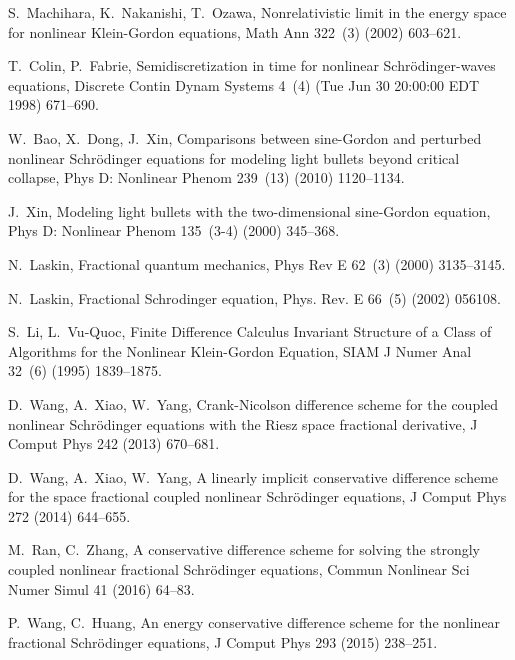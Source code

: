 \documentclass[preprint,compress,3p,10pt,fleqn]{elsarticle}
\numberwithin{equation}{section}
\begin{document}
\begin{thebibliography}{10}
	S.~Machihara, K.~Nakanishi, T.~Ozawa, Nonrelativistic limit in the energy space for nonlinear Klein-Gordon equations, Math Ann
	  322~(3) (2002) 603--621.
	
	T.~Colin, P.~Fabrie, Semidiscretization in time for nonlinear Schr\"odinger-waves equations, Discrete Contin
	  Dynam Systems 4~(4) (Tue Jun 30 20:00:00 EDT 1998) 671--690.
	
	W.~Bao, X.~Dong, J.~Xin, Comparisons between sine-Gordon and perturbed nonlinear Schr\"odinger equations
	  for modeling light bullets beyond critical collapse, Phys D: Nonlinear Phenom 239~(13) (2010) 1120--1134.
	
	J.~Xin, Modeling light bullets with the two-dimensional sine-Gordon equation, Phys D: Nonlinear Phenom 135~(3-4) (2000) 345--368.
	
	N.~Laskin, Fractional quantum mechanics, Phys Rev E 62~(3) (2000) 3135--3145.
	
	N.~Laskin, Fractional Schrodinger equation, Phys. Rev. E 66~(5) (2002) 056108.
	
	S.~Li, L.~Vu-Quoc, Finite Difference Calculus Invariant Structure of a Class of Algorithms for the Nonlinear Klein-Gordon Equation, 
SIAM J Numer Anal 32~(6) (1995) 1839--1875.
	
	D.~Wang, A.~Xiao, W.~Yang, Crank-Nicolson difference scheme for the coupled nonlinear Schr\"odinger equations with
	  the Riesz space fractional derivative, J Comput Phys 242 (2013) 670--681.
	
	D.~Wang, A.~Xiao, W.~Yang, A linearly implicit conservative difference scheme for the space fractional
	  coupled nonlinear Schr\"odinger equations, J Comput Phys 272 (2014) 644--655.
	
	M.~Ran, C.~Zhang, A conservative difference scheme for solving the strongly coupled nonlinear
	  fractional Schr\"odinger equations, Commun Nonlinear Sci Numer Simul 41 (2016) 64--83.
	
	P.~Wang, C.~Huang, An energy conservative difference scheme for the nonlinear fractional
	  Schr\"odinger equations, J Comput Phys 293 (2015) 238--251.
	

\end{thebibliography}
\end{document}
